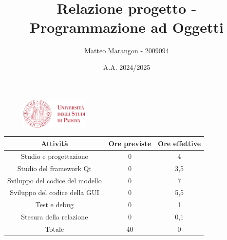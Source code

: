 \documentclass[10pt]{article}
\title{Relazione progetto - Programmazione ad Oggetti}
\author{Matteo Marangon - 2009094}
\date{A.A. 2024/2025}
\begin{document}
\begin{figure}
    \centering
    \includegraphics[width=0.3\textwidth]{./unipdlogo.png}
\end{figure}
\maketitle

\newpage

\tableofcontents
\newpage

\begin{center}
    \begin{tabular}{| c | c | c |} \hline
    Attività & Ore previste & Ore effettive \\\hline
    Studio e progettazione & 0 & 4 \\
    Studio del framework Qt & 0 & 3,5 \\
    Sviluppo del codice del modello & 0 & 7 \\
    Sviluppo del codice della GUI & 0 & 5,5 \\
    Test e debug & 0 & 1 \\
    Stesura della relazione & 0 & 0,1 \\\hline
    Totale & 40 & 0 \\\hline
    \end{tabular}
\end{center}
\end{document}
